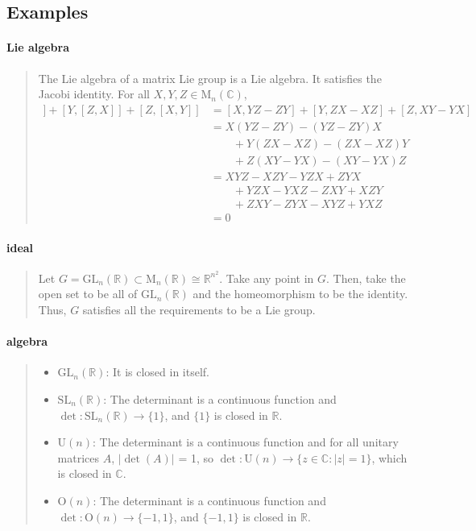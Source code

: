 \documentclass[letterpaper, 10pt]{article}
\theoremstyle{theostyle}
\begin{document}
\subsection{Examples}

\paragraph{Lie algebra}
\begin{quote}
    The Lie algebra of a matrix Lie group is a Lie algebra.
    It satisfies the Jacobi identity. 
    For all \(X, Y, Z \in \mathrm{M}_n (\mathbb{C})\), 
    \begin{align*}
        [X, [Y, Z]] + [Y, [Z, X]] + [Z, [X, Y]] &= [X, YZ - ZY] + [Y, ZX - XZ] + [Z, XY - YX]\\
        &= X(YZ - ZY) - (YZ - ZY)X \\
        &\qquad + Y(ZX - XZ) - (ZX - XZ)Y \\
        &\qquad + Z(XY - YX) - (XY - YX)Z \\
        &= XYZ - XZY -YZX + ZYX \\
        &\qquad + YZX - YXZ -ZXY + XZY \\
        &\qquad + ZXY - ZYX - XYZ + YXZ \\
        &= 0
    \end{align*}
\end{quote}
\paragraph{ideal}
\begin{quote}
    Let \(G = \mathrm{GL}_n(\mathbb{R}) \subset \mathrm{M}_n (\mathbb{R}) \cong \mathbb{R}^{n^2}\).
    Take any point in \(G\).
    Then, take the open set to be all of \(\mathrm{GL}_n(\mathbb{R})\) and the homeomorphism to be the identity.
    Thus, \(G\) satisfies all the requirements to be a Lie group.
\end{quote}

\paragraph{algebra}
\begin{quote}
    \begin{itemize}
        \item \(\mathrm{GL}_n(\mathbb{R})\): It is closed in itself.
        \item \(\mathrm{SL}_n (\mathbb{R})\):
        The determinant is a continuous function and \(\det : \mathrm{SL}_n (\mathbb{R}) \rightarrow \{1\}\), and \(\{1\}\) is closed in \(\mathbb{R}\).
        \item \(\mathrm{U}(n)\): 
        The determinant is a continuous function and for all unitary matrices \(A\), \(\lvert \det{(A)} \rvert\) = 1, so \(\det : \mathrm{U}(n) \rightarrow \{z \in \mathbb{C} : \lvert z \rvert = 1\}\), which is closed in \(\mathbb{C}\).
        \item \(\mathrm{O}(n)\):
        The determinant is a continuous function and \(\det : \mathrm{O}(n) \rightarrow \{-1, 1\}\), and \(\{-1,1\}\) is closed in \(\mathbb{R}\).
    \end{itemize}
\end{quote}
\end{document}
